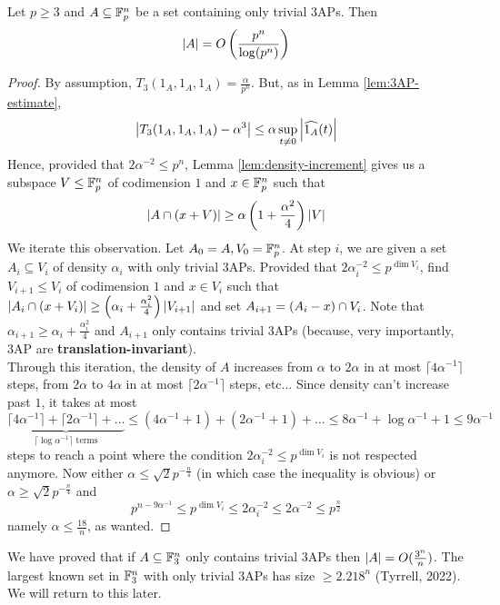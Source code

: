 \documentclass{article}
\begin{document}
\begin{thm}[Meshulam]\label{thm:meshulam}
  Let $p \ge 3$ and $A \subseteq \mathbb F_p^n$ be a set containing only trivial 3APs. Then
  $$\left\lvert A\right\rvert = O\left(\frac{p^n}{\log(p^n)}\right)$$
\end{thm}
\begin{proof}
  By assumption, $T_3(1_A, 1_A, 1_A) = \frac\alpha{p^n}$. But, as in Lemma \ref{lem:3AP-estimate},
  $$\left\lvert T_3(1_A, 1_A, 1_A) - \alpha^3\right\rvert \le \alpha \sup_{t \ne 0} \left\lvert \widehat{1_A}(t)\right\rvert$$
  Hence, provided that $2\alpha^{-2} \le p^n$, Lemma \ref{lem:density-increment} gives us a subspace $V \le \mathbb F_p^n$ of codimension $1$ and $x \in \mathbb F_p^n$ such that
  $$\left\lvert A \cap (x + V)\right\rvert \ge \alpha\left(1 + \frac{\alpha^2}4\right)\left\lvert V\right\rvert$$
  We iterate this observation. Let $A_0 = A, V_0 = \mathbb F_p^n$. At step $i$, we are given a set $A_i \subseteq V_i$ of density $\alpha_i$ with only trivial 3APs. Provided that $2\alpha_i^{-2} \le p^{\dim V_i}$, find $V_{i + 1} \le V_i$ of codimension $1$ and $x \in V_i$ such that $\left\lvert A_i \cap (x + V_i)\right\rvert \ge \left(\alpha_i + \frac{\alpha_i^2}4\right)\left\lvert V_{i + 1}\right\rvert$ and set $A_{i + 1} = (A_i - x) \cap V_i$. Note that $\alpha_{i + 1} \ge \alpha_i + \frac{\alpha_i^2}4$ and $A_{i + 1}$ only contains trivial 3APs (because, very importantly, 3AP are {\bf translation-invariant}). \\
  Through this iteration, the density of $A$ increases from $\alpha$ to $2\alpha$ in at most $\lceil 4\alpha^{-1}\rceil$ steps, from $2\alpha$ to $4\alpha$ in at most $\lceil 2\alpha^{-1}\rceil$ steps, etc... Since density can't increase past $1$, it takes at most
  $$\underbrace{\lceil 4\alpha^{-1}\rceil + \lceil 2\alpha^{-1}\rceil + \dots}_{\lceil \log \alpha^{-1}\rceil \text{ terms}} \le (4\alpha^{-1} + 1) + (2\alpha^{-1} + 1) + \dots \le 8\alpha^{-1} + \log \alpha^{-1} + 1 \le 9\alpha^{-1}$$
  steps to reach a point where the condition $2\alpha_i^{-2} \le p^{\dim V_i}$ is not respected anymore. Now either $\alpha \le \sqrt 2 p^{-\frac n4}$ (in which case the inequality is obvious) or $\alpha \ge \sqrt 2 p^{-\frac n4}$ and
  $$p^{n - 9\alpha^{-1}} \le p^{\dim V_i} \le 2\alpha_i^{-2} \le 2\alpha^{-2} \le p^{\frac n2}$$
  namely $\alpha \le \frac{18}n$, as wanted.
\end{proof}

\newlec

We have proved that if $A \subseteq \mathbb F_3^n$ only contains trivial 3APs then $\left\lvert A\right\rvert = O(\frac{3^n}n)$. The largest known set in $\mathbb F_3^n$ with only trivial 3APs has size $\ge 2.218^n$ (Tyrrell, 2022). We will return to this later.
\end{document}
